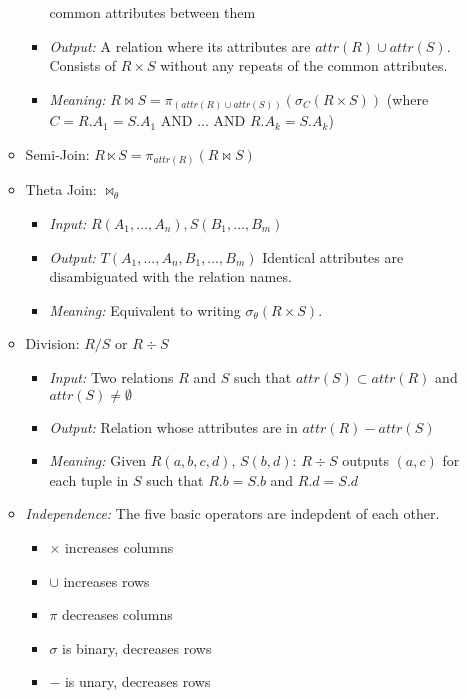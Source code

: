 \documentclass[landscape,8pt]{extarticle}
\begin{document}
\begin{multicols}{4}
\begin{itemize}
\begin{itemize}
\begin{itemize}
            common attributes between them
            \item \emph{Output:} A relation where its attributes are $attr(R) \cup attr(S)$.
            Consists of $R \times S$ without any repeats of the common attributes.
            \item \emph{Meaning:} $R \bowtie S = \pi_{(attr(R) \cup attr(S))} (\sigma_{C} (R \times
            S))$ (where $C = R.A_1 = S.A_1 \text{ AND } \dots \text{ AND } R.A_k = S.A_k$)
        \end{itemize}
        \item Semi-Join: $R \ltimes S = \pi_{attr(R)}(R \bowtie S)$
        \item Theta Join: $\bowtie_\theta$
        \begin{itemize}
            \item \emph{Input:} $R(A_1, \dots, A_n), S(B_1, \dots, B_m)$
            \item \emph{Output:} $T(A_1, \dots, A_n, B_1, \dots, B_m)$ Identical attributes are
            disambiguated with the relation names.
            \item \emph{Meaning:} Equivalent to writing $\sigma_{\theta}(R \times S)$.
        \end{itemize}
        \item Division: $R/S$ or $R \div S$
        \begin{itemize}
            \item \emph{Input:} Two relations $R$ and $S$ such that $attr(S) \subset attr(R)$ and
            $attr(S) \neq \emptyset$
            \item \emph{Output:} Relation whose attributes are in $attr(R) - attr(S)$
            \item \emph{Meaning:} Given $R(a,b,c,d)$, $S(b,d)$: $R \div S$ outputs $(a,c)$ for each
            tuple in $S$ such that $R.b = S.b$ and $R.d = S.d$
        \end{itemize}
        \item \emph{Independence:} The five basic operators are indepdent of each other.
        \begin{itemize}
            \item $\times$ increases columns
            \item $\cup$ increases rows
            \item $\pi$ decreases columns
            \item $\sigma$ is binary, decreases rows
            \item $-$ is unary, decreases rows

\end{itemize}
\end{itemize}
\end{itemize}
\end{multicols}
\end{document}
